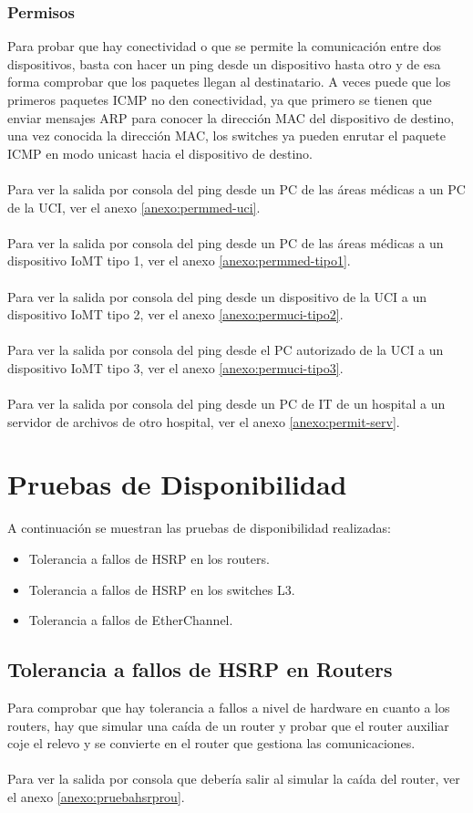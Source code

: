\subsubsection{Permisos}
Para probar que hay conectividad o que se permite la comunicación entre dos dispositivos, basta con hacer un ping desde un dispositivo hasta otro y de esa forma comprobar que los paquetes llegan al destinatario. A veces puede que los primeros paquetes ICMP no den conectividad, ya que primero se tienen que enviar mensajes ARP para conocer la dirección MAC 
del dispositivo de destino, una vez conocida la dirección MAC, los switches ya pueden enrutar el paquete ICMP en modo unicast hacia el dispositivo de destino.
\\ \\
Para ver la salida por consola del ping desde un PC de las áreas médicas a un PC de la UCI, ver el anexo \ref{anexo:permmed-uci}.
\\ \\
Para ver la salida por consola del ping desde un PC de las áreas médicas a un dispositivo IoMT tipo 1, ver el anexo \ref{anexo:permmed-tipo1}.
\\ \\
Para ver la salida por consola del ping desde un dispositivo de la UCI a un dispositivo IoMT tipo 2, ver el anexo \ref{anexo:permuci-tipo2}.
\\ \\
Para ver la salida por consola del ping desde el PC autorizado de la UCI a un dispositivo IoMT tipo 3, ver el anexo \ref{anexo:permuci-tipo3}.
\\ \\
Para ver la salida por consola del ping desde un PC de IT de un hospital a un servidor de archivos de otro hospital, ver el anexo \ref{anexo:permit-serv}.

\section{Pruebas de Disponibilidad}
A continuación se muestran las pruebas de disponibilidad realizadas:
\begin{itemize}
    \item Tolerancia a fallos de HSRP en los routers.
    \item Tolerancia a fallos de HSRP en los switches L3.
    \item Tolerancia a fallos de EtherChannel.
\end{itemize}

\subsection{Tolerancia a fallos de HSRP en Routers}
Para comprobar que hay tolerancia a fallos a nivel de hardware en cuanto a los routers, hay que simular una caída de un router y probar que el router auxiliar coje el relevo y se convierte en 
el router que gestiona las comunicaciones. 
\\ \\
Para ver la salida por consola que debería salir al simular la caída del router, ver el anexo \ref{anexo:pruebahsrprou}.

